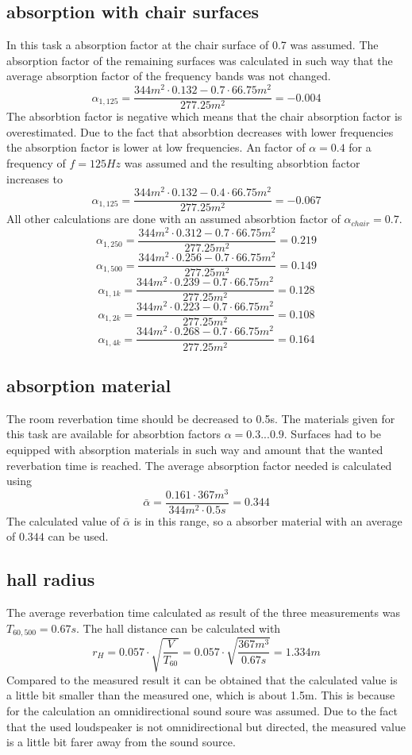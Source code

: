 \documentclass{article}
\begin{document}
\subsection{absorption with chair surfaces}
In this task a absorption factor at the chair surface of 0.7 was assumed. The absorption factor of the remaining surfaces was calculated in such way that the average absorption factor of the frequency bands was not changed. 
$$\alpha_{1,125}=\frac{344m^2\cdot 0.132-0.7\cdot 66.75m^2}{277.25m^2}=-0.004$$
The absorbtion factor is negative which means that the chair absorption factor is overestimated. Due to the fact that absorbtion decreases with lower frequencies the absorption factor is lower at low frequencies.  An factor of $\alpha=0.4$ for a frequency of $f=125Hz$ was assumed and the resulting absorbtion factor increases to
 $$\alpha_{1,125}=\frac{344m^2\cdot 0.132-0.4\cdot 66.75m^2}{277.25m^2}=-0.067$$
All other calculations are done with an assumed absorbtion factor of $\alpha_{chair}=0.7$.
 $$\alpha_{1,250}=\frac{344m^2\cdot 0.312-0.7\cdot 66.75m^2}{277.25m^2}=0.219$$
 $$\alpha_{1,500}=\frac{344m^2\cdot 0.256-0.7\cdot 66.75m^2}{277.25m^2}=0.149$$
 $$\alpha_{1,1k}=\frac{344m^2\cdot 0.239-0.7\cdot 66.75m^2}{277.25m^2}=0.128$$
 $$\alpha_{1,2k}=\frac{344m^2\cdot 0.223-0.7\cdot 66.75m^2}{277.25m^2}=0.108$$
 $$\alpha_{1,4k}=\frac{344m^2\cdot 0.268-0.7\cdot 66.75m^2}{277.25m^2}=0.164$$

\subsection{absorption material}
The room reverbation time should be decreased to 0.5s. The materials given for this task are available for absorbtion factors $\alpha=0.3 ... 0.9$. Surfaces had to be equipped with absorption materials in such way and amount that the wanted reverbation time is reached. The average absorption factor needed is calculated using
$$\bar{\alpha}=\frac{0.161\cdot 367m^3}{344m^2\cdot 0.5s}=0.344$$
The calculated value of $\bar{\alpha}$ is in this range, so a absorber material with an average of $0.344$ can be used.

\subsection{hall radius}
The average reverbation time calculated as result of the three measurements was $T_{60,500}=0.67s$. The hall distance can be calculated with 
$$r_H=0.057\cdot\sqrt{\frac{V}{T_{60}}}=0.057\cdot\sqrt{\frac{367m^3}{0.67s}}=1.334m$$
Compared to the measured result it can be obtained that the calculated value is a little bit smaller than the measured one, which is about 1.5m. This is because for the calculation an omnidirectional sound soure was assumed. Due to the fact that the used loudspeaker is not omnidirectional but directed, the measured value is a little bit farer away from the sound source. 
\end{document}
